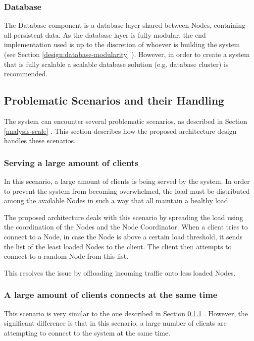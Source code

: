 \clearpage

\subsubsection{Database}
The Database component is a database layer shared between Nodes, containing all persistent data. As the database layer is fully modular, the end implementation used is up to the discretion of whoever is building the system (see Section \ref{design:database-modularity} ). However, in order to create a system that is fully scalable a scalable database solution (e.g. database cluster) is recommended.

\subsection{Problematic Scenarios and their Handling}
The system can encounter several problematic scenarios, as described in Section \ref{analysis-scale} . This section describes how the proposed architecture design handles these scenarios.

\subsubsection{Serving a large amount of clients} \label{design:serving-large-number-clients}
In this scenario, a large amount of clients is being served by the system. In order to prevent the system from becoming overwhelmed, the load must be distributed among the available Nodes in such a way that all maintain a healthy load.

The proposed architecture deals with this scenario by spreading the load using the coordination of the Nodes and the Node Coordinator. When a client tries to connect to a Node, in case the Node is above a certain load threshold, it sends the list of the least loaded Nodes to the client. The client then attempts to connect to a random Node from this list.

This resolves the issue by offloading incoming traffic onto less loaded Nodes.

\subsubsection{A large amount of clients connects at the same time}
This scenario is very similar to the one described in Section \ref{design:serving-large-number-clients} . However, the significant difference is that in this scenario, a large number of clients are attempting to connect to the system at the same time.

